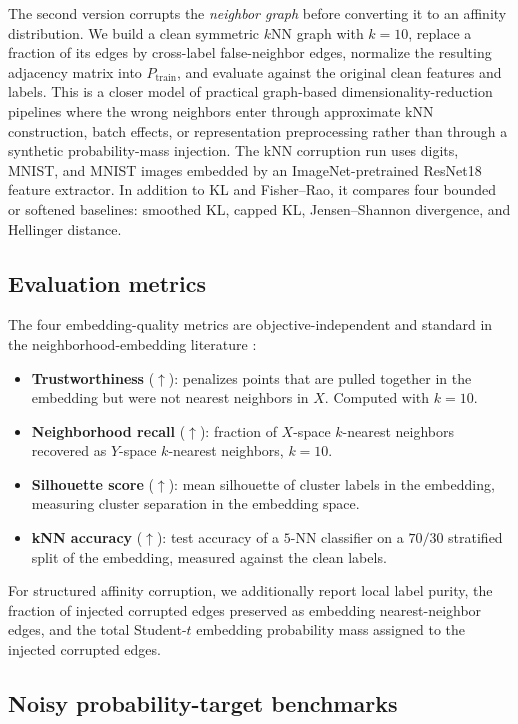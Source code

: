 \documentclass[11pt]{article}
\begin{document}
The second version corrupts the \emph{neighbor graph} before converting it to an affinity
distribution. We build a clean symmetric $k$NN graph with $k=10$, replace a fraction of its
edges by cross-label false-neighbor edges, normalize the resulting adjacency matrix into
$P_{\mathrm{train}}$, and evaluate against the original clean features and labels. This is a
closer model of practical graph-based dimensionality-reduction pipelines where the wrong
neighbors enter through approximate kNN construction, batch effects, or representation
preprocessing rather than through a synthetic probability-mass injection. The kNN corruption
run uses digits, MNIST, and MNIST images embedded by an ImageNet-pretrained ResNet18 feature
extractor. In addition to KL and Fisher--Rao, it compares four bounded or softened baselines:
smoothed KL, capped KL, Jensen--Shannon divergence, and Hellinger distance.

\subsection{Evaluation metrics}
\label{sec:metrics}

The four embedding-quality metrics are objective-independent and standard in the
neighborhood-embedding literature \citep{venna2010information}:
\begin{itemize}
  \item \textbf{Trustworthiness} ($\uparrow$): penalizes points that are pulled together in the
        embedding but were not nearest neighbors in $X$. Computed with $k=10$.
  \item \textbf{Neighborhood recall} ($\uparrow$): fraction of $X$-space $k$-nearest
        neighbors recovered as $Y$-space $k$-nearest neighbors, $k=10$.
  \item \textbf{Silhouette score} ($\uparrow$): mean silhouette of cluster labels in the
        embedding, measuring cluster separation in the embedding space.
  \item \textbf{kNN accuracy} ($\uparrow$): test accuracy of a $5$-NN classifier on a
        $70/30$ stratified split of the embedding, measured against the clean labels.
\end{itemize}
For structured affinity corruption, we additionally report local label purity, the fraction of
injected corrupted edges preserved as embedding nearest-neighbor edges, and the total
Student-$t$ embedding probability mass assigned to the injected corrupted edges.

\subsection{Noisy probability-target benchmarks}
\label{sec:ml-stress-methods}
\end{document}
